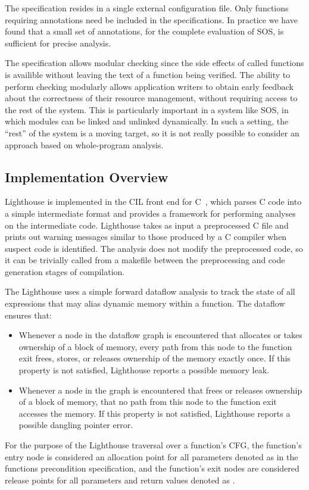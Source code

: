 The specification resides in a single external configuration file.
%
Only functions requiring annotations need be included in the specifications.
%
In practice we have found that a small set of annotations, \numannote for
the complete evaluation of SOS, is sufficient for precise analysis. 



The specification allows modular checking since the side effects of
called functions is availible without leaving the text of a function being
verified.
%
The ability to perform checking modularly allows application writers to
obtain early feedback about the correctness of their resource management,
without requiring access to the rest of the system.  
%
This is particularly important in a system like SOS, in which modules can be
linked and unlinked dynamically.  
%
In such a setting, the ``rest'' of the system is a moving target, so it is
not really possible to consider an approach based on whole-program analysis.



\subsection{Implementation Overview}



Lighthouse is implemented in the CIL front end for C~\cite{CIL}, which
parses C code into a simple intermediate format and provides a framework for
performing analyses on the intermediate code. 
%
Lighthouse takes as input a preprocessed C file and prints out warning
messages similar to those produced by a C compiler when suspect code is
identified.
%
The analysis does not modify the preprocessed code, so it can be trivially
called from a makefile between the preprocessing and code generation stages
of compilation.



The Lighthouse uses a simple forward dataflow analysis to track the state of
all expressions that may alias dynamic memory within a function.
%
The dataflow ensures that:
%
\begin{itemize}
%
\item Whenever a node in the dataflow graph is encountered that allocates or
takes ownership of a block of memory, every path from this node to the
function exit frees, stores, or releases ownership of the memory exactly
once.  
%
If this property is not satisfied, Lighthouse reports a possible memory
leak.
%
\item Whenever a node in the graph is encountered that frees or releases
ownership of a block of memory, that no path from this node to the function
exit accesses the memory.  
%
If this property is not satisfied, Lighthouse reports a possible dangling
pointer error.
%
\end{itemize}
%
For the purpose of the Lighthouse traversal over a function's CFG, the
function's entry node is considered an allocation point for all parameters
denoted as  in the functions precondition specification, and the
function's exit nodes are considered release points for all parameters and
return values denoted as .



